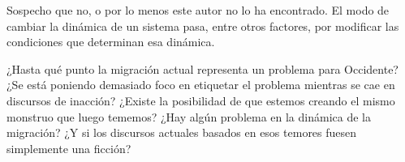 \documentclass[12pt,a4paper]{article}
\begin{document}
Sospecho que no, o por lo menos este autor no lo ha encontrado. El modo de cambiar la dinámica de un sistema pasa, entre otros factores, por modificar las condiciones que determinan esa dinámica.

¿Hasta qué punto la migración actual representa un problema para Occidente? ¿Se está poniendo demasiado foco en etiquetar el problema mientras se cae en discursos de inacción? ¿Existe la posibilidad de que estemos creando el mismo monstruo que luego tememos? ¿Hay algún problema en la dinámica de la migración? ¿Y si los discursos actuales basados en esos temores fuesen simplemente una ficción?
\end{document}
